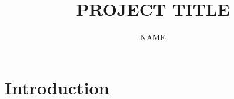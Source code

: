 \documentclass[11pt,letterpaper,twoside,reqno,nosumlimits]{amsart}
\title{PROJECT TITLE}
\author{NAME}
\begin{document}
\maketitle
\thispagestyle{empty}
\section{Introduction}

\end{document}
